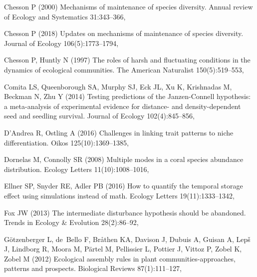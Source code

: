 \documentclass[smallcondensed,referee]{svjour3}       %
\begin{document}
\begin{thebibliography}{56}
Chesson P (2000) Mechanisms of maintenance of species diversity. Annual review
  of Ecology and Systematics 31:343--366,

Chesson P (2018) Updates on mechanisms of maintenance of species diversity.
  Journal of Ecology 106(5):1773--1794, 

Chesson P, Huntly N (1997) The roles of harsh and fluctuating conditions in the
  dynamics of ecological communities. The American Naturalist 150(5):519--553,

Comita LS, Queenborough SA, Murphy SJ, Eck JL, Xu K, Krishnadas M, Beckman N,
  Zhu Y (2014) {Testing predictions of the Janzen-Connell hypothesis: a
  meta-analysis of experimental evidence for distance- and density-dependent
  seed and seedling survival}. Journal of Ecology 102(4):845--856,

D'Andrea R, Ostling A (2016) Challenges in linking trait patterns to niche
  differentiation. Oikos 125(10):1369--1385, 

Dornelas M, Connolly SR (2008) Multiple modes in a coral species abundance
  distribution. Ecology Letters 11(10):1008--1016,

Ellner SP, Snyder RE, Adler PB (2016) How to quantify the temporal storage
  effect using simulations instead of math. Ecology Letters 19(11):1333--1342,

Fox JW (2013) The intermediate disturbance hypothesis should be abandoned.
  Trends in Ecology \& Evolution 28(2):86--92, 

G\"{o}tzenberger L, de~Bello F, Br\r{a}then KA, Davison J, Dubuis A, Guisan A,
  Lep\v{s} J, Lindborg R, Moora M, P\"{a}rtel M, Pellissier L, Pottier J,
  Vittoz P, Zobel K, Zobel M (2012) Ecological assembly rules in plant
  communities-approaches, patterns and prospects. Biological Reviews
  87(1):111--127, 


\end{thebibliography}
\end{document}
